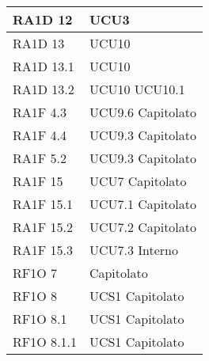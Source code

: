 \begin{center}
\begin{longtable}{ | p{5cm} | p{5cm} |}
        RA1D 12 &  UCU3 \newline  \\ \hline      
        RA1D 13 &  UCU10 \newline  \\ \hline      
        RA1D 13.1 &  UCU10 \newline  \\ \hline      
        RA1D 13.2 &  UCU10 \newline  UCU10.1 \newline  \\ \hline      
        RA1F 4.3 &  UCU9.6 \newline  Capitolato \newline  \\ \hline      
        RA1F 4.4 &  UCU9.3 \newline  Capitolato \newline  \\ \hline      
        RA1F 5.2 &  UCU9.3 \newline  Capitolato \newline  \\ \hline      
        RA1F 15 &  UCU7 \newline  Capitolato \newline  \\ \hline      
        RA1F 15.1 &  UCU7.1 \newline  Capitolato \newline  \\ \hline      
        RA1F 15.2 &  UCU7.2 \newline  Capitolato \newline  \\ \hline      
        RA1F 15.3 &  UCU7.3 \newline  Interno \newline  \\ \hline      
        RF1O 7 &  Capitolato \newline  \\ \hline      
        RF1O 8  &  UCS1 \newline  Capitolato \newline  \\ \hline      
        RF1O 8.1  &  UCS1 \newline  Capitolato \newline  \\ \hline      
        RF1O 8.1.1  &  UCS1 \newline  Capitolato \newline  \\ \hline      

\end{longtable}
\end{center}

